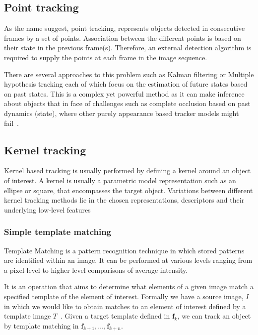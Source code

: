 
\subsection{Point tracking}\label{literature_review_point}
As the name suggest, point tracking, represents objects detected in consecutive
frames by a set of points. Association between the different points is based on
their state in the previous frame(s). Therefore, an external detection algorithm
is required to supply the points at each frame in the image sequence.

There are several approaches to this problem such as Kalman filtering or
Multiple hypothesis tracking each of which focus on the estimation of future
states based on past states. This is a complex yet powerful method as it can
make inference about objects that in face of challenges such as complete
occlusion based on past dynamics (state), where other purely appearance based tracker
models might fail~\cite{Shantaiya2013,Prajapati2015}.

\subsection{Kernel tracking}\label{literature_review_kernel}
Kernel based tracking is usually performed by defining a kernel around an object
of interest. A kernel is usually a parametric model representation such as an
ellipse or square, that encompasses the target object. 
Variations between different kernel tracking methods lie in the chosen representations,
descriptors and their underlying low-level features~\cite{Prajapati2015}

\subsubsection{Simple template matching}
Template Matching is a pattern recognition technique in which stored patterns 
are identified within an image. It can be performed at various levels ranging
from a pixel-level to higher level comparisons of average intensity.

It is an operation that aims to determine what elements of a given image match a
specified template of the element of interest. Formally we have a source image,
$I$ in which we would like to obtain matches to an element of interest defined
by a template image $T$~\cite{Brunelli}. 
Given a target template defined in $\mathbf{f}_k$, we can track an object by 
template matching in $\mathbf{f}_{k+1},\ldots,\mathbf{f}_{k+n}$.

